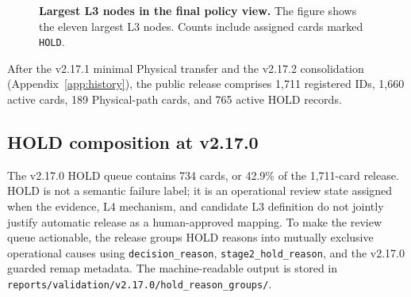 \documentclass[11pt,a4paper]{article}
\newcommand{\code}[1]{\texttt{#1}}
\begin{document}
\begin{figure}[H]
\centering
{}
\caption{\textbf{Largest L3 nodes in the final policy view.} The figure shows
the eleven largest L3 nodes. Counts include assigned cards marked
\code{HOLD}.}
\label{fig:l3}
\end{figure}

After the v2.17.1 minimal Physical transfer and the v2.17.2 consolidation
(Appendix~\ref{app:history}), the public release comprises 1,711 registered
IDs, 1,660 active cards, 189 Physical-path cards, and 765 active HOLD records.

\subsection{HOLD composition at v2.17.0}

The v2.17.0 HOLD queue contains 734 cards, or 42.9\% of the 1,711-card
release. HOLD is not a semantic failure label; it is an operational review
state assigned when the evidence, L4 mechanism, and candidate L3 definition do
not jointly justify automatic release as a human-approved mapping. To make the
review queue actionable, the release groups HOLD reasons into mutually
exclusive operational causes using \code{decision\_reason},
\code{stage2\_hold\_reason}, and the v2.17.0 guarded remap metadata. The
machine-readable output is stored in
\code{reports/validation/v2.17.0/hold\_reason\_groups/}.
\end{document}
